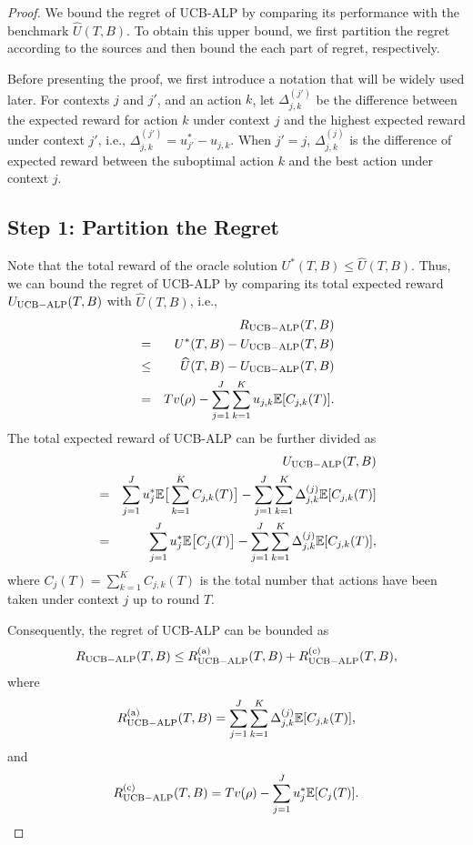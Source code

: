 \begin{proof}
We bound the regret of UCB-ALP by comparing its performance  with the benchmark $\widehat{U}(T,B)$. To obtain this upper bound, we first partition the regret according to the sources and then bound the each part of regret, respectively.

Before presenting the proof, we first introduce a notation that will be widely used later. For contexts $j$ and $j'$, and an action $k$, let $\Delta_{j,k}^{(j')}$ be the difference between the expected reward for action $k$ under context $j$ and the highest expected reward under context $j'$, i.e., $\Delta_{j,k}^{(j')} = u_{j'}^* - u_{j,k}$.
When $j' = j$, $\Delta_{j,k}^{(j)}$ is the difference of expected reward between the suboptimal action $k$ and the best action under context $j$.


\subsection{Step 1: Partition the Regret}

Note that the total reward of the oracle solution $U^*(T,B)  \leq \widehat{U}(T,B)$. Thus, we can bound the regret of UCB-ALP by comparing its total expected reward $U_{\rm UCB-ALP}(T,B)$ with $\widehat{U}(T,B)$, i.e.,
\begin{eqnarray}
&&R_{\rm {UCB-ALP}}(T, B) \nonumber \\
&=& U^*(T,B) - U_{\rm UCB-ALP}(T,B) \nonumber \\
& \leq &\widehat{U}(T,B) - U_{\rm UCB-ALP}(T,B) \nonumber\\
&= & T v(\rho) - \sum_{j = 1}^J \sum_{k =1}^K u_{j,k} \mathbb{E}[C_{j,k}(T)].
\end{eqnarray}
The total expected reward of UCB-ALP can be further divided as
\begin{eqnarray}
&& U_{\rm UCB-ALP}(T,B) \nonumber \\
& =&  \sum_{j = 1}^J u_j^* \mathbb{E}\big[\sum_{k=1}^K C_{j,k}(T)\big] - \sum_{j=1}^J \sum_{k=1}^K \Delta_{j,k}^{(j)}\mathbb{E}[C_{j,k}(T)] \nonumber \\
& =&  \sum_{j = 1}^J u_j^*\mathbb{E}\big[C_{j}(T)\big] - \sum_{j=1}^J \sum_{k=1}^K \Delta_{j,k}^{(j)}\mathbb{E}[C_{j,k}(T)], \nonumber
\end{eqnarray}
where $C_j(T) = \sum_{k=1}^K C_{j,k}(T)$ is the total number that actions have been taken under context $j$ up to round $T$.

Consequently, the regret of UCB-ALP can be bounded as
\begin{eqnarray}\label{eq:regret_ucb_alp__nonboundary_details}
R_{\rm {UCB-ALP}}(T, B) \leq R_{\rm {UCB-ALP}}^{({\rm a})}(T, B) + R_{\rm {UCB-ALP}}^{({\rm c})}(T, B),
\end{eqnarray}
where
\begin{eqnarray}
R_{\rm {UCB-ALP}}^{({\rm a})}(T, B) = \sum_{j=1}^J \sum_{k=1}^K \Delta_{j,k}^{(j)}\mathbb{E}[C_{j,k}(T)], \nonumber
\end{eqnarray}
and
\begin{eqnarray}
R_{\rm {UCB-ALP}}^{({\rm c})}(T, B) = T v(\rho) - \sum_{j  = 1}^J u_j^*\mathbb{E}[C_j(T)]. \nonumber
\end{eqnarray}


\end{proof}
